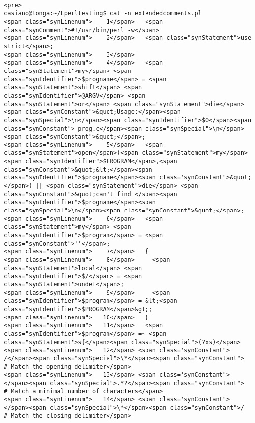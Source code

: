 \begin{verbatim}

<pre>
casiano@tonga:~/Lperltesting$ cat -n extendedcomments.pl
<span class="synLinenum">    1</span>   <span class="synComment">#!/usr/bin/perl -w</span>
<span class="synLinenum">    2</span>   <span class="synStatement">use strict</span>;
<span class="synLinenum">    3</span> 
<span class="synLinenum">    4</span>   <span class="synStatement">my</span> <span class="synIdentifier">$progname</span> = <span class="synStatement">shift</span> <span class="synIdentifier">@ARGV</span> <span class="synStatement">or</span> <span class="synStatement">die</span> <span class="synConstant">&quot;Usage:</span><span class="synSpecial">\n</span><span class="synIdentifier">$0</span><span class="synConstant"> prog.c</span><span class="synSpecial">\n</span><span class="synConstant">&quot;</span>;
<span class="synLinenum">    5</span>   <span class="synStatement">open</span>(<span class="synStatement">my</span> <span class="synIdentifier">$PROGRAM</span>,<span class="synConstant">&quot;&lt;</span><span class="synIdentifier">$progname</span><span class="synConstant">&quot;</span>) || <span class="synStatement">die</span> <span class="synConstant">&quot;can't find </span><span class="synIdentifier">$progname</span><span class="synSpecial">\n</span><span class="synConstant">&quot;</span>;
<span class="synLinenum">    6</span>   <span class="synStatement">my</span> <span class="synIdentifier">$program</span> = <span class="synConstant">''</span>;
<span class="synLinenum">    7</span>   {
<span class="synLinenum">    8</span>     <span class="synStatement">local</span> <span class="synIdentifier">$/</span> = <span class="synStatement">undef</span>;
<span class="synLinenum">    9</span>     <span class="synIdentifier">$program</span> = &lt;<span class="synIdentifier">$PROGRAM</span>&gt;;
<span class="synLinenum">   10</span>   }
<span class="synLinenum">   11</span>   <span class="synIdentifier">$program</span> =~ <span class="synStatement">s{</span><span class="synSpecial">(?xs)</span>
<span class="synLinenum">   12</span> <span class="synConstant">    /</span><span class="synSpecial">\*</span><span class="synConstant">  # Match the opening delimiter</span>
<span class="synLinenum">   13</span> <span class="synConstant">    </span><span class="synSpecial">.*?</span><span class="synConstant">  # Match a minimal number of characters</span>
<span class="synLinenum">   14</span> <span class="synConstant">    </span><span class="synSpecial">\*</span><span class="synConstant">/  # Match the closing delimiter</span>

\end{verbatim}
